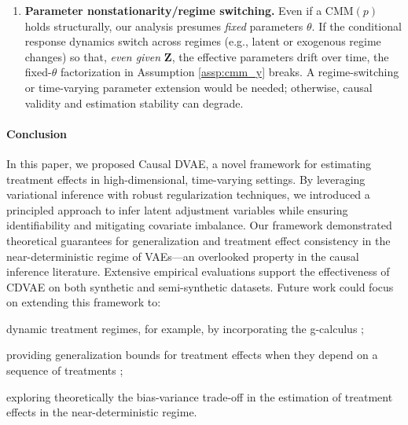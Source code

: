 \documentclass[10pt]{article} %
\begin{document}
\begin{enumerate}
\item \textbf{Parameter nonstationarity/regime switching.}
Even if a $\mathrm{CMM}(p)$ holds structurally, our analysis presumes \emph{fixed} parameters $\theta$. If the conditional response dynamics switch across regimes (e.g., latent or exogenous regime changes) so that, \emph{even given} $\mathbf{Z}$, the effective parameters drift over time, the fixed-$\theta$ factorization in Assumption \ref{assp:cmm_y} breaks. A regime-switching or time-varying parameter extension would be needed; otherwise, causal validity and estimation stability can degrade.
\end{enumerate}
 










\paragraph{Conclusion}  
In this paper, we proposed Causal DVAE, a novel framework for estimating treatment effects in high-dimensional, time-varying settings. By leveraging variational inference with robust regularization techniques, we introduced a principled approach to infer latent adjustment variables while ensuring identifiability and mitigating covariate imbalance. Our framework demonstrated theoretical guarantees for generalization and treatment effect consistency in the near-deterministic regime of VAEs—an overlooked property in the causal inference literature. Extensive empirical evaluations support the effectiveness of CDVAE on both synthetic and semi-synthetic datasets. Future work could focus on extending this framework to:  
\begin{inparaenum}
    \item dynamic treatment regimes, for example, by incorporating the g-calculus \citep{robins1997causalNested, vansteelandt2014structural};
    \item providing generalization bounds for treatment effects when they depend on a sequence of treatments \citep{lewis2021doubledebiased, vankadara2022causal, oh2022generalizationDTR, csillag2024generalization};
    \item exploring theoretically the bias-variance trade-off in the estimation of treatment effects in the near-deterministic regime.  
\end{inparaenum}

\newpage
\end{document}
